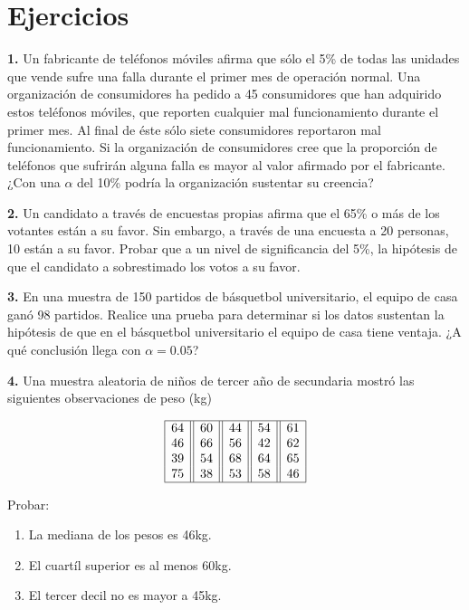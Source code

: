 \documentclass[
  a4paper,
  oneside,
  openany]{book}
\begin{document}
\hypertarget{ejercicios}{%
\chapter{Ejercicios}\label{ejercicios}}

\textbf{1.} Un fabricante de teléfonos móviles afirma que sólo el 5\% de todas las unidades que vende sufre una falla durante el primer mes de operación normal. Una organización de consumidores ha pedido a 45 consumidores que han adquirido estos teléfonos móviles, que reporten cualquier mal funcionamiento durante el primer mes. Al final de éste sólo siete consumidores reportaron mal funcionamiento. Si la organización de consumidores cree que la proporción de teléfonos que sufrirán alguna falla es mayor al valor afirmado por el fabricante. ¿Con una \(\alpha\) del 10\% podría la organización sustentar su creencia?

\textbf{2.} Un candidato a través de encuestas propias afirma que el 65\% o más de los votantes están a su favor. Sin embargo, a través de una encuesta a 20 personas, 10 están a su favor. Probar que a un nivel de significancia del 5\%, la hipótesis de que el candidato a sobrestimado los votos a su favor.

\textbf{3.} En una muestra de 150 partidos de básquetbol universitario, el equipo de casa ganó 98 partidos. Realice una prueba para determinar si los datos sustentan la hipótesis de que en el básquetbol universitario el equipo de casa tiene ventaja. ¿A qué conclusión llega con \(\alpha= 0.05\)?

\textbf{4.} Una muestra aleatoria de niños de tercer año de secundaria mostró las siguientes observaciones de peso (kg)

\[
\begin{array}{|c| |c| |c| |c| |c|} 
\hline
64& 60& 44& 54& 61\\
46& 66& 56& 42& 62\\
39& 54& 68& 64& 65\\
75& 38& 53& 58&46\\
\hline
\end{array}
\]

Probar:

\begin{enumerate}
\def\labelenumi{\alph{enumi})}
\item
  La mediana de los pesos es 46kg.
\item
  El cuartíl superior es al menos 60kg.
\item
  El tercer decil no es mayor a 45kg.
\end{enumerate}
\end{document}

